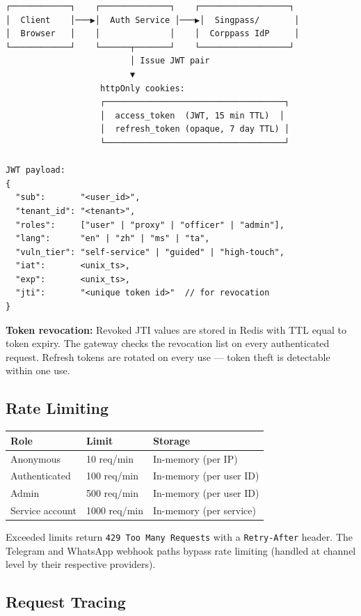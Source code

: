 \documentclass[12pt,a4paper]{article}
\begin{document}
\begin{lstlisting}
┌────────────┐    ┌──────────────┐    ┌──────────────────┐
│  Client    │───▶│  Auth Service │───▶│  Singpass/       │
│  Browser   │    │              │    │  Corppass IdP     │
└────────────┘    └──────┬───────┘    └──────────────────┘
                         │ Issue JWT pair
                         ▼
                   httpOnly cookies:
                   ┌────────────────────────────────────┐
                   │  access_token  (JWT, 15 min TTL)  │
                   │  refresh_token (opaque, 7 day TTL) │
                   └────────────────────────────────────┘

JWT payload:
{
  "sub":       "<user_id>",
  "tenant_id": "<tenant>",
  "roles":     ["user" | "proxy" | "officer" | "admin"],
  "lang":      "en" | "zh" | "ms" | "ta",
  "vuln_tier": "self-service" | "guided" | "high-touch",
  "iat":       <unix_ts>,
  "exp":       <unix_ts>,
  "jti":       "<unique token id>"  // for revocation
}
\end{lstlisting}

\textbf{Token revocation:} Revoked JTI values are stored in Redis with TTL equal to
token expiry. The gateway checks the revocation list on every authenticated request.
Refresh tokens are rotated on every use — token theft is detectable within one use.

\subsection{Rate Limiting}

\begin{tabular}{@{}lll@{}}
\toprule
\textbf{Role} & \textbf{Limit} & \textbf{Storage} \\
\midrule
Anonymous       & 10 req/min    & In-memory (per IP)      \\
Authenticated   & 100 req/min   & In-memory (per user ID) \\
Admin           & 500 req/min   & In-memory (per user ID) \\
Service account & 1000 req/min  & In-memory (per service) \\
\bottomrule
\end{tabular}

Exceeded limits return \texttt{429 Too Many Requests} with a \texttt{Retry-After}
header. The Telegram and WhatsApp webhook paths bypass rate limiting (handled
at channel level by their respective providers).

\subsection{Request Tracing}
\end{document}
